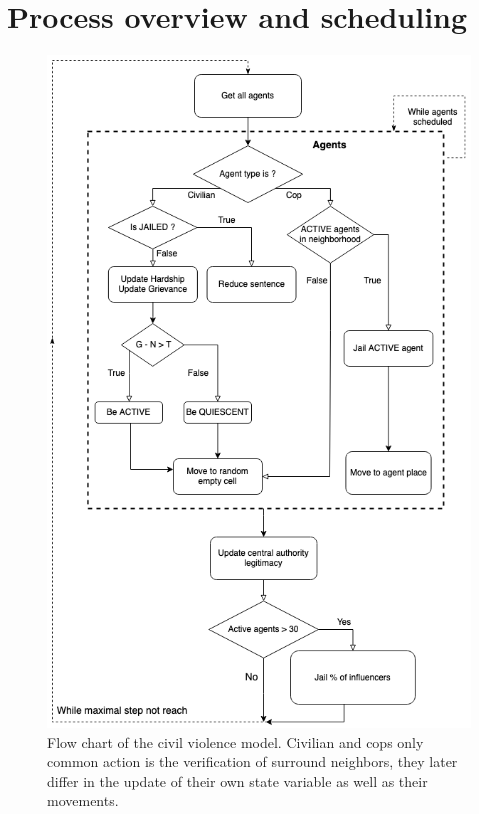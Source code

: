 \documentclass[10pt]{article}
\begin{document}
    \newpage

    

    \newpage

    \appendix
    \section{Process overview and scheduling}
    \vspace*{0pt}
    \label{appendix:A}

    \begin{figure}[ht!]
        \centering
        \includegraphics[width=.75\linewidth]{pictures/process_overview_scheduling/civil_violence_flow_chart_2.png}
        \caption{Flow chart of the civil violence model. Civilian and cops only common action is the verification of surround neighbors, they later differ in the update of their own state variable as well as their movements.}
        \label{fig:flow_chart_model}
    \end{figure}
\end{document}
